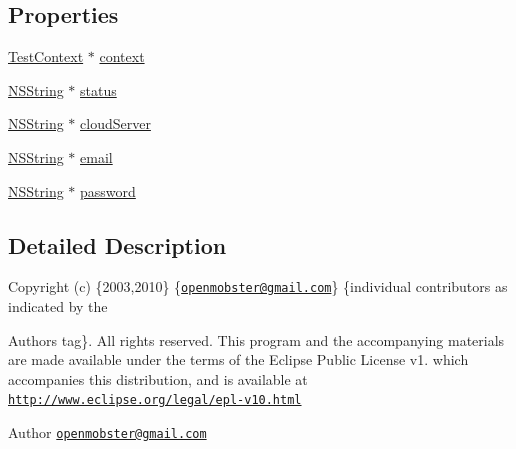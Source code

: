 \subsection*{\-Properties}
\begin{DoxyCompactItemize}
\item 
\hyperlink{interface_test_context}{\-Test\-Context} $\ast$ \hyperlink{interface_test_suite_a1852d1ae3801301dbcdf5324e276474a}{context}
\item 
\hyperlink{class_n_s_string}{\-N\-S\-String} $\ast$ \hyperlink{interface_test_suite_aa55bc04e8394fa1860e92e098b858c40}{status}
\item 
\hyperlink{class_n_s_string}{\-N\-S\-String} $\ast$ \hyperlink{interface_test_suite_aee65c3c5003d0da11b95cf653cc19756}{cloud\-Server}
\item 
\hyperlink{class_n_s_string}{\-N\-S\-String} $\ast$ \hyperlink{interface_test_suite_aa962f8c847eab597c3b920ccadad864b}{email}
\item 
\hyperlink{class_n_s_string}{\-N\-S\-String} $\ast$ \hyperlink{interface_test_suite_a08b3d84247b47890d0de254b43020cfc}{password}
\end{DoxyCompactItemize}


\subsection{\-Detailed \-Description}
\-Copyright (c) \{2003,2010\} \{\href{mailto:openmobster@gmail.com}{\tt openmobster@gmail.\-com}\} \{individual contributors as indicated by the \begin{DoxyAuthor}{\-Authors}
tag\}. \-All rights reserved. \-This program and the accompanying materials are made available under the terms of the \-Eclipse \-Public \-License v1. which accompanies this distribution, and is available at \href{http://www.eclipse.org/legal/epl-v10.html}{\tt http\-://www.\-eclipse.\-org/legal/epl-\/v10.\-html}
\end{DoxyAuthor}
\begin{DoxyAuthor}{\-Author}
\href{mailto:openmobster@gmail.com}{\tt openmobster@gmail.\-com} 
\end{DoxyAuthor}



